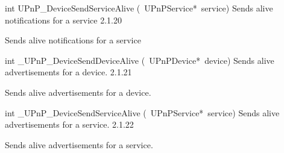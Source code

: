 \documentclass{article}
\begin{document}
\begin{cxxentry}
\begin{cxxentry}
\begin{cxxfunction}
\begin{cxxdoc}
\end{cxxdoc}
\end{cxxfunction}
\begin{cxxfunction}
{int}
        {UPnP\_DeviceSendServiceAlive}
        {(\ UPnPService*\ service)}
        {Sends alive notifications for a service}
        {2.1.20}
\begin{cxxdoc}
Sends alive notifications for a service


\end{cxxdoc}
\end{cxxfunction}
\begin{cxxfunction}
{int}
        {\_UPnP\_DeviceSendDeviceAlive}
        {(\ UPnPDevice*\ device)}
        {Sends alive advertisements for a device.}
        {2.1.21}
\begin{cxxdoc}
Sends alive advertisements for a device.


\end{cxxdoc}
\end{cxxfunction}
\begin{cxxfunction}
{int}
        {\_UPnP\_DeviceSendServiceAlive}
        {(\ UPnPService*\ service)}
        {Sends alive advertisements for a service.}
        {2.1.22}
\begin{cxxdoc}
Sends alive advertisements for a service.



\end{cxxdoc}
\end{cxxfunction}
\end{cxxentry}
\end{cxxentry}
\end{document}
